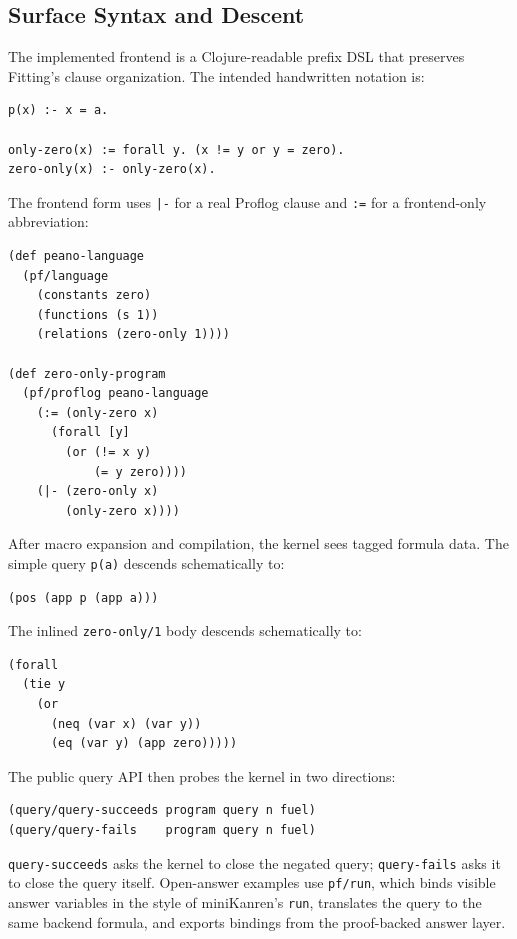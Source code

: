 \documentclass[acmsmall,screen,review,anonymous]{acmart}
\begin{document}
\subsection{Surface Syntax and Descent}

The implemented frontend is a Clojure-readable prefix DSL that preserves
Fitting's clause organization.  The intended handwritten notation is:

\begin{verbatim}
p(x) :- x = a.

only-zero(x) := forall y. (x != y or y = zero).
zero-only(x) :- only-zero(x).
\end{verbatim}

The frontend form uses \texttt{|-} for a real Proflog clause and \texttt{:=}
for a frontend-only abbreviation:

\begin{verbatim}
(def peano-language
  (pf/language
    (constants zero)
    (functions (s 1))
    (relations (zero-only 1))))

(def zero-only-program
  (pf/proflog peano-language
    (:= (only-zero x)
      (forall [y]
        (or (!= x y)
            (= y zero))))
    (|- (zero-only x)
        (only-zero x))))
\end{verbatim}

After macro expansion and compilation, the kernel sees tagged formula data.  The
simple query \texttt{p(a)} descends schematically to:

\begin{verbatim}
(pos (app p (app a)))
\end{verbatim}

The inlined \texttt{zero-only/1} body descends schematically to:

\begin{verbatim}
(forall
  (tie y
    (or
      (neq (var x) (var y))
      (eq (var y) (app zero)))))
\end{verbatim}

The public query API then probes the kernel in two directions:

\begin{verbatim}
(query/query-succeeds program query n fuel)
(query/query-fails    program query n fuel)
\end{verbatim}

\texttt{query-succeeds} asks the kernel to close the negated query;
\texttt{query-fails} asks it to close the query itself.  Open-answer examples
use \texttt{pf/run}, which binds visible answer variables in the style of
miniKanren's \texttt{run}, translates the query to the same backend formula,
and exports bindings from the proof-backed answer layer.
\end{document}
